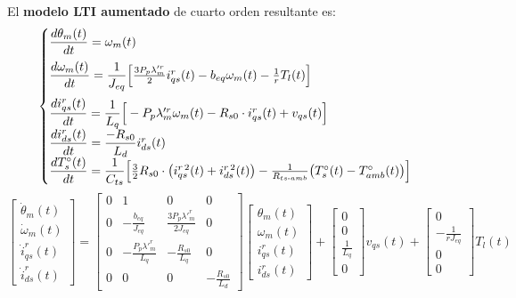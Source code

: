 \documentclass[12pt, a4paper,journal, onecolumn, compsoc]{IEEEtran}
\begin{document}
El \textbf{modelo LTI aumentado} de cuarto orden resultante es:
\begin{equation} \label{eq:sis_escalar_LTI_aug}
\begin{cases}
    \vspace{0.2cm}
    \dfrac{d\theta_m(t)}{dt} = \omega_m(t) \\
    \vspace{0.2cm}
    \dfrac{d\omega_m(t)}{dt} = \dfrac{1}{J_{eq}}\Big[\frac{3 P_p \lambda'^r_m}{2} i_{qs}^r(t) - b_{eq} \omega_m(t) - \frac{1}{r} T_l(t)\Big] \\
    \dfrac{di_{qs}^r(t)}{dt} = \dfrac{1}{L_q}\Big[-P_p \lambda'^r_m \omega_m(t) - R_{s0}\cdot i_{qs}^r(t) + v_{qs}(t)\Big] \\
    \dfrac{di_{ds}^r(t)}{dt} = \dfrac{-R_{s0}}{L_d}i_{ds}^r(t)\\
    \dfrac{dT_s^\circ(t)}{dt} = \dfrac{1}{C_{ts}}\Big[\frac{3}{2}R_{s0}\cdot \big(i_{qs}^{r\,2}(t)+i_{ds}^{r\,2}(t)\big)-\frac{1}{R_{ts\text{-}amb}}\big(T_s^\circ(t) - T_{amb}^\circ(t)\big)\Big]
\end{cases}
\end{equation}
\begingroup
\renewcommand{\arraystretch}{1.8} 
\footnotesize\begin{equation}
\begin{bmatrix}
\dot{\theta}_m (t)\\
\dot{\omega}_m(t)\\
\dot{i}_{qs}^r(t)\\
\dot{i}_{ds}^r(t)
\end{bmatrix}
= 
\begin{bmatrix}
0 & 1 & 0 & 0 \\
0  & -\frac{b_{eq}}{J_{eq}} & \frac{3 P_p \lambda'^r_m}{2 J_{eq}} & 0 \\
 0 &  -\frac{P_p \lambda'^r_m}{L_q} & -\frac{R_{s0}}{L_q} & 0 \\
 0 & 0 & 0 & -\frac{R_{s0}}{L_d}
\end{bmatrix}
\begin{bmatrix}
\theta_m(t) \\
\omega_m (t)\\
i_{qs}^r(t) \\
i_{ds}^r(t)
\end{bmatrix}
+
\begin{bmatrix}
0  \\
0  \\
\frac{1}{L_q} \\
0
\end{bmatrix}
v_{qs}(t) 
+
\begin{bmatrix}
0 \\
-\frac{1}{rJ_{eq}} \\
0 \\
0
\end{bmatrix}
T_l(t)
\end{equation}\normalsize
\endgroup
\end{document}
